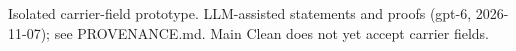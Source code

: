 \documentclass[11pt]{article}
\begin{document}

\bigskip
{\footnotesize Isolated carrier-field prototype. LLM-assisted statements and proofs
(gpt-6, 2026-11-07); see PROVENANCE.md. Main Clean does not yet accept carrier fields.}
\end{document}
